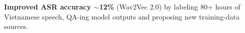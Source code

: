 
\vspace{1pt}
\begin{resume_list}
  \item \textbf{Improved ASR accuracy $\sim$12\%} (Wav2Vec 2.0) by labeling 80+ hours of Vietnamese speech, QA-ing model outputs and proposing new training-data sources.
\end{resume_list}
